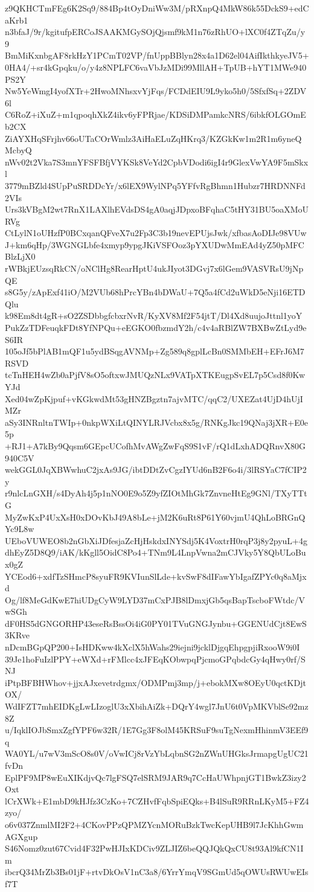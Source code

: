 z9QKHCTmFEg6K2Sq9/884Bp4tOyDniWw3M/pRXnpQ4MkW86k55DckS9+edCaKrb1
n3bfaJ/9r/kgitufpERCoJSAAKMGySOjQjsmf9kM1n76zRhUO+lXC0f4ZTqZu/y9
BmMiKxnbgAF8rkHzY1PCmT02VP/fnUppBBlyn28x4a1D62el04AifIkthkyeJV5+
0HA4/+sr4kGpqku/o/y4z8NPLFC6vaVbJzMDi99MllAH+TpUB+hYT1MWe940PS2Y
Nw5YeWmgI4yofXTr+2HwoMNhsxvYjFqs/FCDdEIU9L9yko5h0/5SfxfSq+2ZDV6l
C6RoZ+iXuZ+m1qpoqhXkZ4ikv6yFPRjae/KDSiDMPamkcNRS/6ibkfOLGOmEb2CX
ZiAYXHqSFrjhv66oUTaCOrWmlz3AiHaELuZqHKrq3/KZGkKw1m2R1m6yneQMcbyQ
nWv02t2Vka7S3mnYFSFBfjVYKSk8VeYd2CpbVDodi6igI4r9GlexVwYA9F5mSkxl
3779mBZld4SUpPuSRDDcYr/x6lEX9WylNPq5YFfvRgBhmn1Hubzr7HRDNNFd2VIs
Urs3kVBgM2wt7RnX1LAXlhEVdsDS4gA0aqjJDpxoBFqhaC5tHY31BU5oaXMoURVg
CtLylN1oUHzfP0BCxqanQFveX7u2Fp3C3b19nevEPUjsJwk/xfbasAoDIJe98VUw
J+km6qHp/3WGNGLbfe4xmyp9ypgJKiVSFOoz3pYXUDwMmEAd4yZ50pMFCBlzLjX0
rWBkjEUzsqRkCN/oNClHg8RearHptU4ukJIyot3DGvj7x6lGem9VASVRsU9jNpQE
s8G5y/zApExf41iO/M2VUb68hPrcYBn4bDWaU+7Q5a4fCd2uWkD5eNji16ETDQlu
k98Em8dt4gR+sO2ZSDbbgfcbxrNvR/KyXV8Mf2F54jtT/Dl4Xd8uujoJttnl1yoY
PukZzTDFeuqkFDt8YfNPQu+eEGKO0fbzmdY2h/c4v4aRBlZW7BXBwZtLyd9eS6IR
105oJf5bPlAB1mQF1u5ydBSqgAVNMp+Zg589q8gplLcBn0SMMbEH+EFrJ6M7RSVD
tcTnHEH4wZb0aPjfV8sO5oftxwJMUQzNLx9VATpXTKEugpSvEL7p5Csd8f0KwYJd
Xed04wZpKjpuf+vKGkwdMt53gHNZBgztn7ajvMTC/qqC2/UXEZat4UjD4hUjIMZr
aSy3INRnltnTWIp+0nkpWXiLtQINYLRJVcbx8x5g/RNKgJkc19QNaj3jXR+E0e5p
+RJ1+A7kBy9Qqsm6GEpcUCofhMvAWgZwFqS9S1vF/rQ1dLxhADQRnvX80G940C5V
wekGGL0JqXBWwhuC2jxAs9JG/ibtDDtZvCgzIYUd6nB2F6o4i/3lRSYaC7fCIP2y
r9nlcLnGXH/s4DyAh4j5p1nNO0E9o5Z9yfZIOtMhGk7ZnvneHtEg9GNl/TXyTTtG
MyZwKxP4UxXsH0xDOvKbJ49A8bLe+jM2K6uRt8P61Y60vjmU4QhLoBRGnQYc9L8w
UEboVUWEO8b2nGbXiJDfesjaZcHjHskdxINYSdj5K4VoxtrH0rqP3j8y2pyuL+4g
dhEyZ5D8Q9/iAK/kKgll5OidC8Po4+TNm9L4LnpVwna2mCJVky5Y8QbULoBux0gZ
YCEod6+xdfTzSHmcP8syuFR9KVIunSlLde+kvSwF8dIFawYbIgafZPYc0q8aMjxd
Og/lf8MeGdKwE7hiUDgCyW9LYD37mCxPJB8lDmxjGb5qsBapTscboFWtdc/VwSGh
dF0HS5dGNGORHP43eseRsBssOi4iG0PY01TVuGNGJynbu+GGENUdCjt8EwS3KRve
nDcmBGpQP200+IsHDKww4kXclX5hWahs29iejni9jcklDjgqEhpgpjiRxooW9i0I
39Je1hoFuIzlPPY+eWXd+rFMlcc4xJFEqKObwpqPjcmoGPqbdcGy4qHwy0rf/SNJ
iPtpBFBHWhov+jjxAJxevetrdgmx/ODMPmj3mp/j+ebokMXw8OEyU0qctKDjtOX/
WdIFZT7mhEIDKgLwLIzoglU3xXbihAiZk+DQrY4wgl7JnU6t0VpMKVblSe92mz8Z
u/IqklIOJbSmxZgfYPF6w32R/1E7Gg3F8olM45KRSuF9suTgNexmHhinmV3EEf9q
WA0YL/u7wV3mScO8s0V/oVwICj8rVzYbLqbnSG2nZWnUHGksJrmapgUgUC21fvDn
EplPF9MP8wEuXIKdjvQc7lgFSQ7elSRM9JAR9q7CcHaUWhpnjGT1BwkZ3izy2Oxt
lCrXWk+E1mbD9kHJfz3CzKo+7CZHvfFqbSpiEQks+B4lSuR9RRnLKyM5+FZ4zyo/
o6v037ZnmlMI2F2+4CKovPPzQPMZYcnMORuBzkTwcKepUHB9l7JcKhhGwmAGXgup
S46Nomz0zut67Cvid4F32PwHJIxKDCiv9ZLJIZ6beQQJQkQxCU8t93Al9kfCN1Im
ibcrQ34MrZb3Bs01jF+rtvDkOsV1nC3a8/6YrrYmqV9SGmUd5qOWUsRWUwEIsf7T
